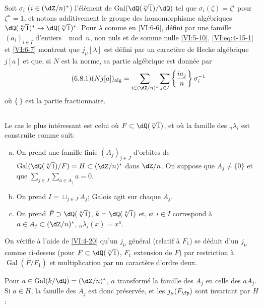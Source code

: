 \documentclass[oneside]{book}
\DeclareMathOperator{\gal}{Gal}
\theoremstyle{sga-source}
\theoremstyle{sga-source-dash}
\theoremstyle{sga-source-dotdash}
\theoremstyle{sga-source-number-note-dash}
\theoremstyle{sga-source-note-number-dotdash}
\theoremstyle{sga-source-example-dotdash}
\theoremstyle{sga-source-inline-number}
\theoremstyle{sga-source-bare-number}
\theoremstyle{sga-source}
\newcommand{\PrintPage}[1]{}\newcommand{\MathPage}[1]{}\newcommand{\PrintCite}[2]{#1}\newcommand{\var}[3]{#1}
\begin{document}
Soit $\sigma_i$ ($i\in (\dZ/n)^\ast$) l'élément de 
$\gal(\dQ(\sqrt[n]{1})/\dQ)$ tel que $\sigma_i(\zeta)=\zeta^i$ pour $\zeta^n=1$, 
et notons additivement le groupe \var{des homomorphisme algébriques}{des homomorphismes algébriques}{S45-SOL-0912} 
$\dQ(\sqrt[n]{1})^\ast \to \dQ(\sqrt[n]{1})^\ast$. Pour $\lambda$ comme en 
\ref{VI:6-6}, défini par une famille $(a_i)_{i\in I}$ d'entiers $\mod n$, non 
nuls et de somme nulle \ref{VI:5-10}, \eqref{VI:eq:4-15-1} et \ref{VI:6-7} 
montrent que $j_\mu[\lambda]$ est défini par un caractère de Hecke 
algébrique $j[a]$ et que, si $N$ est la norme, sa partie algébrique est 
donnée par 
\begin{equation*}\tag{6.8.1}\label{VI:eq:6-8-1}
  (N j[a])_\text{alg} = \sum_{i\in (\dZ/n)^\ast} \sum_{j\in I} \left\{ \frac{i a_j}{n} \right\} \sigma_i^{-1} 
\end{equation*}
où $\{\ \}$ est la partie fractionnaire. 





\subsection{}\label{VI:6-9}

Le cas le plus intéressant est celui où $F\subset \dQ(\sqrt[n]{1})$, et 
où la famille des $_n \lambda_i$ est construite comme suit: 
\begin{enumerate}[a)]
  \item On prend une famille finie $(A_j)_{j\in J}$ d'orbites de 
    $\gal(\dQ(\sqrt[n]{1})/F)=H\subset (\dZ/n)^\ast$ dans $\dZ/n$. On suppose que 
    $A_j\ne\{0\}$ et que $\sum_{j\in J} \sum_{a\in A_j} a=0$. 
  \PrintPage{217}
\item On prend $I=\sqcup_{j\in J} A_j$; Galois agit sur chaque $A_j$. 
  \item On prend $\bar F\supset \dQ(\sqrt[n]{1})$, $k=\dQ(\sqrt[n]{1})$ et, si 
    $i\in I$ correspond à \var{$a\in A_j\subset (\dZ/n)^\ast$}{$a\in A_j\subset\dZ/n$}{S45-ASTRA-S-0037}, 
    $_n\lambda_i(x)=x^a$. 
\end{enumerate}

On vérifie à l'aide de \ref{VI:4-20} qu'un $j_\mu$ général (relatif à 
$F_1$) se déduit d'un $j_\mu$ comme ci-dessus (pour 
$F\subset \dQ(\sqrt[n]{1})$, $F_1$ extension de $F$) par restriction à 
$\gal(\bar F/F_1)$ et multiplication par un caractère d'ordre deux. 

Pour $a\in \gal(k/\dQ)=(\dZ/n)^\ast$, \var{$a$ transformé}{$a$ transforme}{S45-SOL-0919} la famille des $A_j$ 
en celle des $a A_j$. Si $a\in H$, la famille des $A_j$ est donc préservée, 
et les $j_\mu(F_\fp)$ \var{sont invariant par $H$}{sont invariants par $H$}{S45-SOL-0920}: 
\end{document}
